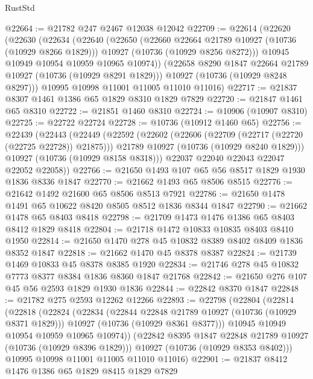 \begin{lexlean}{RustStd}
\begin{coremodule}
@22664 := @21782 @247 @2467 @12038 @12042
@22709 := @22614
    (@22620
      (@22630
        (@22634
          (@22640
            (@22650
              (@22660 @22664 @21789 @10927 (@10736 (@10929 @8266 @1829)))
              @10927
              (@10736 (@10929 @8256 @8272)))
            @10945
            @10949
            @10954
            @10959
            @10965
            @10974))
        (@22658 @8290 @1847 @22664 @21789 @10927 (@10736 (@10929 @8291 @1829)))
        @10927
        (@10736 (@10929 @8248 @8297)))
      @10995
      @10998
      @11001
      @11005
      @11010
      @11016)
@22717 := @21837 @8307 @1461 @1386 @65 @1829 @8310 @1829 @7829
@22720 := @21847 @1461 @65 @8310
@22722 := @21851 @1460 @8310
@22724 := @10906 (@10907 @8310)
@22725 := @22722 @22724
@22728 := @10736 (@10912 @1460 @65)
@22756 := @22439
    (@22443
      (@22449
        (@22592
          (@22602
            (@22606 (@22709 (@22717 (@22720 (@22725 @22728)) @21875)))
            @21789
            @10927
            (@10736 (@10929 @8240 @1829)))
          @10927
          (@10736 (@10929 @8158 @8318)))
        @22037
        @22040
        @22043
        @22047
        @22052
        @22058))
@22766 := @21650 @1493 @107 @65 @56 @8517 @1829 @1930 @1836 @8336 @1847
@22770 := @21662 @1493 @65 @8506 @8515
@22776 := @21642 @1492 @21600 @65 @8506 @8513 @7921
@22786 := @21650 @1478 @1491 @65 @10622 @8420 @8505 @8512 @1836 @8344 @1847
@22790 := @21662 @1478 @65 @8403 @8418
@22798 := @21709 @1473 @1476 @1386 @65 @8403 @8412 @1829 @8418
@22804 := @21718 @1472 @10833 @10835 @8403 @8410 @1950
@22814 := @21650 @1470 @278 @45 @10832 @8389 @8402 @8409 @1836 @8352 @1847
@22818 := @21662 @1470 @45 @8378 @8387
@22824 := @21739 @1469 @10833 @45 @8378 @8385 @1920
@22834 := @21746 @278 @45 @10832 @7773 @8377 @8384 @1836 @8360 @1847 @21768
@22842 := @21650 @276 @107 @45 @56 @2593 @1829 @1930 @1836
@22844 := @22842 @8370 @1847
@22848 := @21782 @275 @2593 @12262 @12266
@22893 := @22798
    (@22804
      (@22814
        (@22818
          (@22824
            (@22834
              (@22844 @22848 @21789 @10927 (@10736 (@10929 @8371 @1829)))
              @10927
              (@10736 (@10929 @8361 @8377)))
            @10945
            @10949
            @10954
            @10959
            @10965
            @10974))
        (@22842 @8395 @1847 @22848 @21789 @10927 (@10736 (@10929 @8396 @1829)))
        @10927
        (@10736 (@10929 @8353 @8402)))
      @10995
      @10998
      @11001
      @11005
      @11010
      @11016)
@22901 := @21837 @8412 @1476 @1386 @65 @1829 @8415 @1829 @7829

\end{coremodule}
\end{lexlean}
